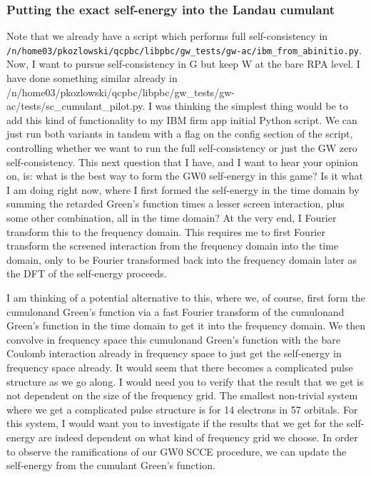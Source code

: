 \subsubsection{Putting the exact self-energy into the Landau cumulant}

Note that we already have a script which performs full self-consistency in
\texttt{/n/home03/pkozlowski/qcpbc/libpbc/gw\_tests/gw-ac/ibm\_from\_abinitio.py}. Now, I want to pursue self-consistency in G but keep W at the bare RPA level. I have done something similar already in /n/home03/pkozlowski/qcpbc/libpbc/gw\_tests/gw-ac/tests/sc\_cumulant\_pilot.py. I was thinking the simplest thing would be to add this kind of functionality to my IBM firm app initial Python script. We can just run both variants in tandem with a flag on the config section of the script, controlling whether we want to run the full self-consistency or just the GW zero self-consistency. This next question that I have, and I want to hear your opinion on, is: what is the best way to form the GW0 self-energy in this game? Is it what I am doing right now, where I first formed the self-energy in the time domain by summing the retarded Green's function times a lesser screen interaction, plus some other combination, all in the time domain? At the very end, I Fourier transform this to the frequency domain. This requires me to first Fourier transform the screened interaction from the frequency domain into the time domain, only to be Fourier transformed back into the frequency domain later as the DFT of the self-energy proceeds.

I am thinking of a potential alternative to this, where we, of course, first form the cumulonand Green's function via a fast Fourier transform of the cumulonand Green's function in the time domain to get it into the frequency domain. We then convolve in frequency space this cumulonand Green's function with the bare Coulomb interaction already in frequency space to just get the self-energy in frequency space already. It would seem that there becomes a complicated pulse structure as we go along. I would need you to verify that the result that we get is not dependent on the size of the frequency grid. The smallest non-trivial system where we get a complicated pulse structure is for 14 electrons in 57 orbitals. For this system, I would want you to investigate if the results that we get for the self-energy are indeed dependent on what kind of frequency grid we choose. 
In order to observe the ramifications of our GW0 SCCE procedure, we can update
the self-energy from the cumulant Green's function.

